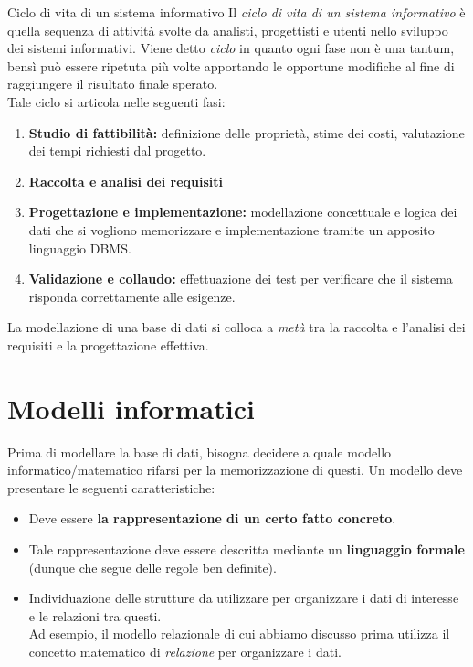 \documentclass[12pt]{report}
\begin{document}
	\begin{definizione}{Ciclo di vita di un sistema informativo}{}
		Il \textit{ciclo di vita di un sistema informativo} è quella sequenza di attività svolte da analisti, progettisti e utenti nello sviluppo dei sistemi informativi.
		Viene detto \textit{ciclo} in quanto ogni fase non è una tantum, bensì può essere ripetuta più volte apportando le opportune modifiche al fine di raggiungere il risultato finale sperato.\\
		\linebreak
		Tale ciclo si articola nelle seguenti fasi:
		\begin{enumerate}
			\item \textbf{Studio di fattibilità:} definizione delle proprietà, stime dei costi, valutazione dei tempi richiesti dal progetto.
			
			\item \textbf{Raccolta e analisi dei requisiti}
			
			\item \textbf{Progettazione e implementazione:} modellazione concettuale e logica dei dati che si vogliono memorizzare e implementazione tramite un apposito linguaggio DBMS.
			
			\item \textbf{Validazione e collaudo:} effettuazione dei test per verificare che il sistema risponda correttamente alle esigenze.
		\end{enumerate}
	\end{definizione}
	
	La modellazione di una base di dati si colloca a \textit{metà} tra la raccolta e l'analisi dei requisiti e la progettazione effettiva.
	
	\section{Modelli informatici}
	Prima di modellare la base di dati, bisogna decidere a quale modello informatico/matematico rifarsi per la memorizzazione di questi.
	Un modello deve presentare le seguenti caratteristiche:
	\begin{itemize}
		\item Deve essere \textbf{la rappresentazione di un certo fatto concreto}.
		
		\item Tale rappresentazione deve essere descritta mediante un \textbf{linguaggio formale} (dunque che segue delle regole ben definite).
		
		\item Individuazione delle strutture da utilizzare per organizzare i dati di interesse e le relazioni tra questi.\\ Ad esempio, il modello relazionale di cui abbiamo discusso prima utilizza il concetto matematico di \textit{relazione} per organizzare i dati.
	\end{itemize}
	
\end{document}
